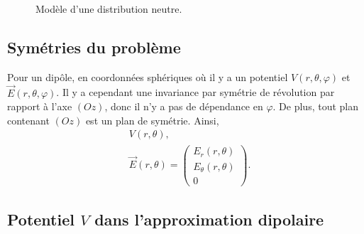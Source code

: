 \begin{figure}
    \centering
    \caption{Modèle d'une distribution neutre.}    
    \label{fig:modele_distribution_neutre}
\end{figure}

\subsection{Symétries du problème}

Pour un dipôle, en coordonnées sphériques où il y a un potentiel $V(r,\theta,\varphi)$ et $\vec{E}(r,\theta,\varphi)$. Il y a cependant une invariance par symétrie de révolution par rapport à l'axe $(Oz)$, donc il n'y a pas de dépendance en $\varphi$. De plus, tout plan contenant $(Oz)$ est un plan de symétrie. Ainsi,
\begin{equation}
    \boxed{
        \begin{aligned}
            &V(r,\theta),\\
            &\vec{E}(r,\theta)=\begin{pmatrix}
                E_r(r,\theta)\\ E_{\theta}(r,\theta)\\0
            \end{pmatrix}.
        \end{aligned}
    }
\end{equation}

\subsection{Potentiel \texorpdfstring{$V$}{V} dans l'approximation dipolaire}

